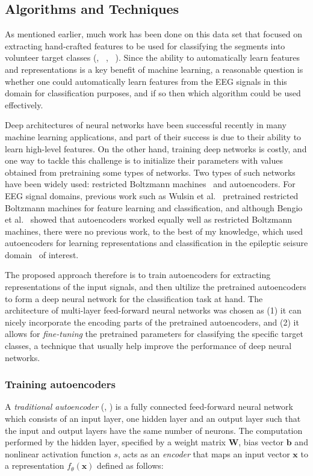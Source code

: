 \documentclass[12pt]{article}
\newcommand{\myvec}[1]{\mathbf{#1}}
\begin{document}
\subsection{Algorithms and Techniques}
\label{sec:solution}

\noindent
As mentioned earlier, much work has been done on this data set that focused on extracting hand-crafted features to be used for classifying the segments into volunteer target classes (\cite{nigam2004neural}, ~\cite{guler2005recurrent}, ~\cite{kannathal2005entropies}). Since the ability to automatically learn features and representations is a key benefit of machine learning, a reasonable question is whether one could automatically learn features from the EEG signals in this domain for classification purposes, and if so then which algorithm could be used effectively.

Deep architectures of neural networks have been successful recently in many machine learning applications, and part of their success is due to their ability to learn high-level features. On the other hand, training deep networks is costly, and one way to tackle this challenge is to initialize their parameters with values obtained from pretraining some types of networks. Two types of such networks have been widely used: restricted Boltzmann machines~\cite{hinton2006reducing} and autoencoders\cite{bengio2007greedy}. For EEG signal domains, previous work such as Wulsin et al.~\cite{wulsin2011modeling} pretrained restricted Boltzmann machines for feature learning and classification, and although Bengio et al.~\cite{bengio2007greedy} showed that autoencoders worked equally well as restricted Boltzmann machines, there were no previous work, to the best of my knowledge, which used autoencoders for learning representations and classification in the epileptic seisure domain~\cite{andrzejak2001indications} of interest.

The proposed approach therefore is to train autoencoders for extracting representations of the input signals, and then ultilize the pretrained autoencoders to form a deep neural network for the classification task at hand. The architecture of multi-layer feed-forward neural networks was chosen as (1) it can nicely incorporate the encoding parts of the pretrained autoencoders, and (2) it allows for \textit{fine-tuning} the pretrained parameters for classifying the specific target classes, a technique that usually help improve the performance of deep neural networks.

\subsubsection{Training autoencoders}
\noindent
A \textit{traditional autoencoder} (\cite{bengio2007greedy}, \cite{vincent2010stacked}) is a fully connected feed-forward neural network which consists of an input layer, one hidden layer and an output layer such that the input and output layers have the same number of neurons. The computation performed by the hidden layer, specified by a weight matrix $\myvec{W}$, bias vector $\myvec{b}$ and nonlinear activation function $s$, acts as an \textit{encoder} that maps an input vector $\myvec{x}$ to a representation $f_{\theta}(\myvec{x})$ defined as follows:
\end{document}
